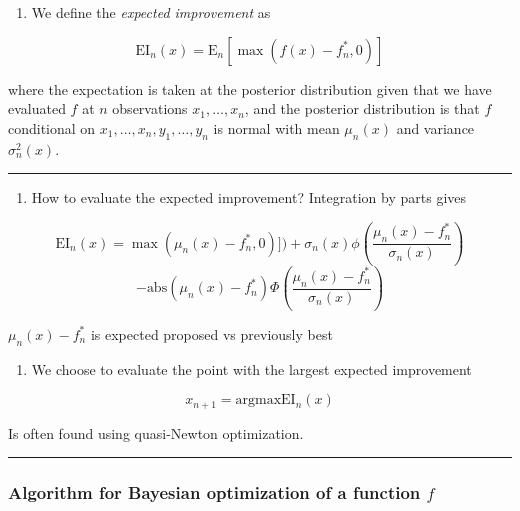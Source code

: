 \documentclass[
  letterpaper,
  DIV=11,
  numbers=noendperiod]{scrartcl}
\providecommand{\tightlist}{%
  \setlength{\itemsep}{0pt}\setlength{\parskip}{0pt}}\usepackage{longtable,booktabs,array}
\begin{document}
\begin{enumerate}
\def\labelenumi{\arabic{enumi})}
\setcounter{enumi}{2}
\tightlist
\item
  We define the \emph{expected improvement} as
\end{enumerate}

\[ \text{EI}_n(x)=\text{E}_n[\max(f(x)-f^{*}_n,0)]\]

where the expectation is taken at the posterior distribution given that
we have evaluated \(f\) at \(n\) observations \(x_1,\ldots, x_n\), and
the posterior distribution is that \(f\) conditional on
\(x_1,\ldots,x_n,y_1,\ldots,y_n\) is normal with mean \(\mu_n(x)\) and
variance \(\sigma^2_n(x)\).

\begin{center}\rule{0.5\linewidth}{0.5pt}\end{center}

\begin{enumerate}
\def\labelenumi{\arabic{enumi})}
\setcounter{enumi}{3}
\tightlist
\item
  How to evaluate the expected improvement? Integration by parts gives
\end{enumerate}

\[ \text{EI}_n(x)=\max(\mu_n(x)-f^{*}_n,0)])+\sigma_n(x) \phi(\frac{\mu_n(x)-f^{*}_n}{\sigma_n(x)}) \]
\[-\text{abs}(\mu_n(x)-f^{*}_n) \Phi(\frac{\mu_n(x)-f^{*}_n}{\sigma_n(x)})\]

\(\mu_n(x)-f^{*}_n\) is expected proposed vs previously best

\begin{enumerate}
\def\labelenumi{\arabic{enumi})}
\setcounter{enumi}{4}
\tightlist
\item
  We choose to evaluate the point with the largest expected improvement
\end{enumerate}

\[ x_{n+1}=\text{argmax}\text{EI}_n(x)\]

Is often found using quasi-Newton optimization.

\begin{center}\rule{0.5\linewidth}{0.5pt}\end{center}

\hypertarget{algorithm-for-bayesian-optimization-of-a-function-f}{%
\subsubsection{\texorpdfstring{Algorithm for Bayesian optimization of a
function
\(f\)}{Algorithm for Bayesian optimization of a function f}}\label{algorithm-for-bayesian-optimization-of-a-function-f}}
\end{document}
